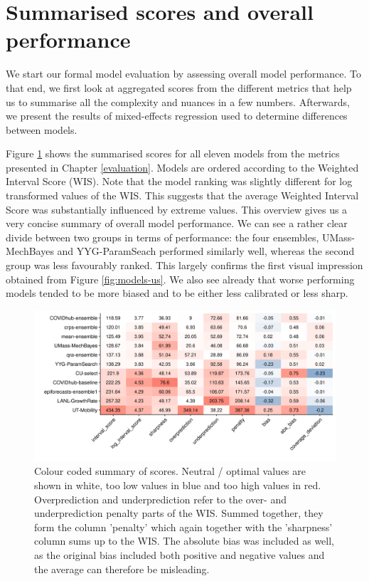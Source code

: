 \documentclass[
]{book}
\begin{document}
\hypertarget{summarised-scores}{%
\section{Summarised scores and overall performance}\label{summarised-scores}}

We start our formal model evaluation by assessing overall model performance. To that end, we first look at aggregated scores from the different metrics that help us to summarise all the complexity and nuances in a few numbers. Afterwards, we present the results of mixed-effects regression used to determine differences between models.

Figure \ref{fig:coloured-summarised-scores} shows the summarised scores for all eleven models from the metrics presented in Chapter \ref{evaluation}. Models are ordered according to the Weighted Interval Score (WIS). Note that the model ranking was slightly different for log transformed values of the WIS. This suggests that the average Weighted Interval Score was substantially influenced by extreme values. This overview gives us a very concise summary of overall model performance. We can see a rather clear divide between two groups in terms of performance: the four ensembles, UMass-MechBayes and YYG-ParamSeach performed similarly well, whereas the second group was less favourably ranked. This largely confirms the first visual impression obtained from Figure \ref{fig:models-us}. We also see already that worse performing models tended to be more biased and to be either less calibrated or less sharp.

\begin{figure}
\includegraphics[width=1\linewidth]{../visualisation/chapter-5-results/scenario-baseline/coloured-summarised-scores} \caption{Colour coded summary of scores. Neutral / optimal values are shown in white, too low values in blue and too high values in red. Overprediction and underprediction refer to the over- and underprediction penalty parts of the WIS. Summed together, they form the column 'penalty' which again together with the 'sharpness' column sums up to the WIS. The absolute bias was included as well, as the original bias included both positive and negative values and the average can therefore be misleading.}\label{fig:coloured-summarised-scores}
\end{figure}
\end{document}
